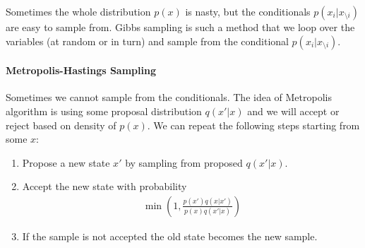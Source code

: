 Sometimes the whole distribution $p(x)$ is nasty, but the conditionals $p(x_i|x_{\setminus i})$ are easy to sample from. Gibbs sampling is such a method that we loop over the variables (at random or in turn) and sample from the conditional $p(x_i|x_{\setminus i})$.

\paragraph{Metropolis-Hastings Sampling}

Sometimes we cannot sample from the conditionals. The idea of Metropolis algorithm is using some proposal distribution $q(x'|x)$ and we will accept or reject based on density of $p(x)$. We can repeat the following steps starting from some $x$:
\begin{enumerate}
	\item Propose a new state $x'$ by sampling from proposed $q(x'|x)$.
	\item Accept the new state with probability
	\begin{align*}
		\min\left(1,\frac{p(x')q(x|x')}{p(x)q(x'|x)}\right)
	\end{align*}
	\item If the sample is not accepted the old state becomes the new sample.
\end{enumerate}

